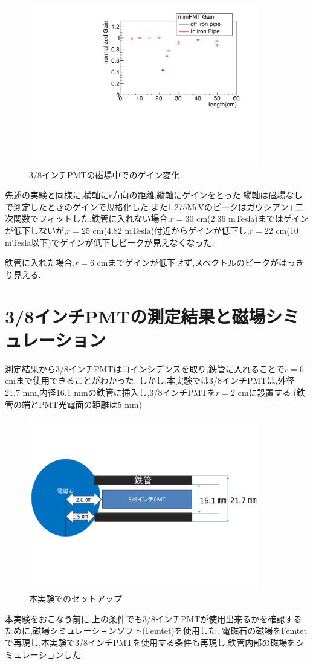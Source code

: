 \begin{figure}[h]
	\centering
		\includegraphics[angle=-90,width=10cm]{fig/iguchi/miniPMTgainG.pdf}
	\caption{3/8インチPMTの磁場中でのゲイン変化}
	\label{miniPMTgainG}
\end{figure}

先述の実験と同様に,横軸にr方向の距離,縦軸にゲインをとった.縦軸は磁場なしで測定したときのゲインで規格化した.また1.275MeVのピークはガウシアン+二次関数でフィットした.鉄管に入れない場合,$r=30$ cm(2.36 mTesla)まではゲインが低下しないが,$r=25$ cm(4.82 mTesla)付近からゲインが低下し,$r=22$ cm(10 mTesla以下)でゲインが低下しピークが見えなくなった.

鉄管に入れた場合,$r=6$ cmまでゲインが低下せず,スペクトルのピークがはっきり見える.


\section{3/8インチPMTの測定結果と磁場シミュレーション}
測定結果から3/8インチPMTはコインシデンスを取り,鉄管に入れることで$r=6$ cmまで使用できることがわかった.
しかし,本実験では3/8インチPMTは,外径21.7 mm,内径16.1 mmの鉄管に挿入し,3/8インチPMTを$r=2$ cmに設置する.(鉄管の端とPMT光電面の距離は5 mm)
\begin{figure}[H]
	\centering
		\includegraphics[width=10cm]{fig/iguchi/honjikken.pdf}
	\caption{本実験でのセットアップ}
	\label{honjikken}
\end{figure}
本実験をおこなう前に,上の条件でも3/8インチPMTが使用出来るかを確認するために,磁場シミュレーションソフト(Femtet)を使用した.
電磁石の磁場をFemtetで再現し,本実験で3/8インチPMTを使用する条件も再現し,鉄管内部の磁場をシミュレーションした.

